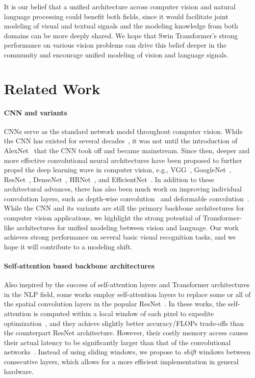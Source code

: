 \documentclass[10pt,twocolumn,letterpaper]{article}
\begin{document}
It is our belief that a unified architecture across computer vision and natural language processing could benefit both fields, since it would facilitate joint modeling of visual and textual signals and the modeling knowledge from both domains can be more deeply shared. We hope that Swin Transformer's strong performance on various vision problems can drive this belief deeper in the community and encourage unified modeling of vision and language signals.

\section{Related Work}

\paragraph{CNN and variants} CNNs serve as the standard network model throughout computer vision. While the CNN has existed for several decades~\cite{lecun1998lenet}, it was not until the introduction of AlexNet~\cite{krizhevsky2012alexnet} that the CNN took off and became mainstream. Since then, deeper and more effective convolutional neural architectures have been proposed to further propel the deep learning wave in computer vision, e.g., VGG~\cite{simonyan2014vgg}, GoogleNet~\cite{szegedy2015googlenet}, ResNet~\cite{he2015resnet}, DenseNet~\cite{huang2017densely}, HRNet~\cite{wang2020deep}, and EfficientNet~\cite{tan2019efficientnet}. In addition to these architectural advances, there has also been much work on improving individual convolution layers, such as depth-wise convolution~\cite{xie2017resnext} and deformable convolution~\cite{dai2017dcnv1,zhu2018dcnv2}. While the CNN and its variants are still the primary backbone architectures for computer vision applications, we highlight the strong potential of Transformer-like architectures for unified modeling between vision and language. Our work achieves strong performance on several basic visual recognition tasks, and we hope it will contribute to a modeling shift. 

\paragraph{Self-attention based backbone architectures} Also inspired by the success of self-attention layers and Transformer architectures in the NLP field, some works employ self-attention layers to replace some or all of the spatial convolution layers in the popular ResNet~\cite{hu2019localrelation,ramachandran2019stand,zhao2020SAN}. In these works, the self-attention is computed within a local window of each pixel to expedite optimization~\cite{hu2019localrelation}, and they achieve slightly better accuracy/FLOPs trade-offs than the counterpart ResNet architecture. However, their costly memory access causes their actual latency to be significantly larger than that of the convolutional networks~\cite{hu2019localrelation}. Instead of using sliding windows, we propose to \emph{shift} windows between consecutive layers, which allows for a more efficient implementation in general hardware.
\end{document}
